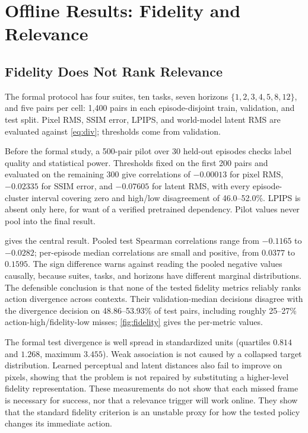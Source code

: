 \documentclass[sigconf,10pt,anonymous,review]{acmart}
\begin{document}
\section{Offline Results: Fidelity and Relevance}

\subsection{Fidelity Does Not Rank Relevance}
\label{sec:fidelity}

The formal protocol has four suites, ten tasks, seven horizons
$\{1,2,3,4,5,8,12\}$, and five pairs per cell: 1{,}400 pairs in each
episode-disjoint train, validation, and test split. Pixel RMS, SSIM error,
LPIPS, and world-model latent RMS are evaluated against \cref{eq:div}; thresholds come from validation.

Before the formal study, a 500-pair pilot over 30 held-out episodes checks
label quality and statistical power. Thresholds fixed on the first 200 pairs and evaluated on the remaining 300
give correlations of $-0.00013$ for pixel RMS, $-0.02335$ for SSIM error, and
$-0.07605$ for latent RMS, with every episode-cluster interval covering zero
and high/low disagreement of 46.0--52.0\%. LPIPS is absent only here, for want
of a verified pretrained dependency. Pilot values never pool into the final
result.

 gives the central result. Pooled test Spearman
correlations range from $-0.1165$ to $-0.0282$; per-episode median
correlations are small and positive, from $0.0377$ to $0.1595$. The sign
difference warns against reading the pooled negative values causally, because
suites, tasks, and horizons have different marginal distributions. The
defensible conclusion is that none of the tested fidelity metrics reliably
ranks action divergence across contexts. Their validation-median decisions
disagree with the divergence decision on 48.86--53.93\% of test pairs,
including roughly 25--27\% action-high/fidelity-low misses; \cref{fig:fidelity}
gives the per-metric values.

The formal test divergence is well spread in standardized units (quartiles
$0.814$ and $1.268$, maximum $3.455$). Weak association is not caused by a collapsed target distribution.
Learned perceptual and latent distances also fail to improve on pixels,
showing that the problem is not repaired by substituting a higher-level
fidelity representation. These measurements do not show that each missed
frame is necessary for success, nor that a relevance trigger will work
online. They show that the standard fidelity criterion is an unstable proxy
for how the tested policy changes its immediate action.
\end{document}
